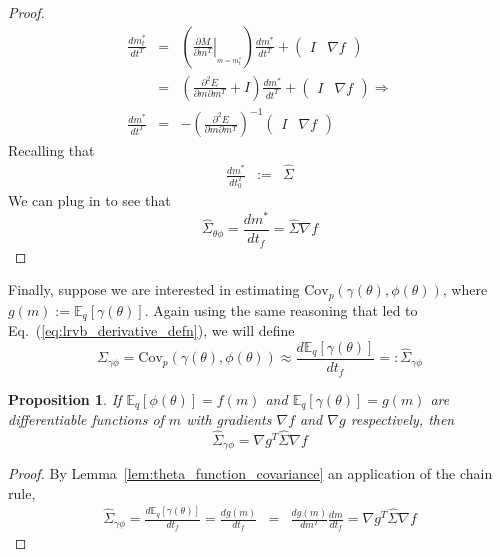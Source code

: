 \documentclass{article}\usepackage[]{graphicx}\usepackage[]{color}
\newcommand{\lem}[1]{Lemma~\ref{lem:#1}}
\newcommand{\eq}[1]{Eq.~(\ref{eq:#1})}
\newcommand{\truecov}{\Sigma} %
\newcommand{\lrcov}{\hat{\Sigma}} %
\newtheorem{proposition}[theorem]{Proposition}
\newcommand{\mbeq}{\mathbb{E}_{q}}
\newcommand{\cov}{\textrm{Cov}}
\begin{document}
\begin{proof}
\begin{eqnarray*}
  \frac{dm_{t}^{*}}{dt^{T}} & = &
    \left(\left.\frac{\partial M}{\partial m^{T}}\right|_{_{m=m_{t}^{*}}}\right)
    \frac{dm^{*}}{dt^{T}}+\left(\begin{array}{cc}
  I & \nabla f\end{array}\right)\\
   & = & \left(\frac{\partial^{2}E}{\partial m\partial m^{T}}+
    I\right)\frac{dm^{*}}{dt^{T}}+\left(\begin{array}{cc}
  I & \nabla f\end{array}\right) \Rightarrow \\
  \frac{dm^{*}}{dt^{T}} & = &
    -\left(\frac{\partial^{2}E}{\partial m\partial m^{T}}\right)^{-1}
    \left(\begin{array}{cc}I & \nabla f\end{array}\right)
  \end{eqnarray*}
  Recalling that
  \begin{eqnarray*}
  \frac{dm^{*}}{dt_{0}^{T}} & := & \lrcov
  \end{eqnarray*}
  We can plug in to see that
  \begin{equation}
  \lrcov_{\theta\phi} = \frac{dm^{*}}{dt_{f}} = \lrcov \nabla f
  \end{equation}
\end{proof}
%
Finally, suppose we are interested in estimating $\cov_p(\gamma(\theta),
\phi(\theta))$, where $g(m) := \mbeq\left[\gamma(\theta)\right]$.  Again using
the same reasoning that led to \eq{lrvb_derivative_defn}, we will define
%
\begin{equation*}
\truecov_{\gamma\phi} = \cov_p(\gamma(\theta), \phi(\theta))
\approx \frac{d \mbeq\left[\gamma(\theta)\right]}{dt_f} =: \lrcov_{\gamma\phi}
\end{equation*}
%
\begin{proposition} \label{prop:function_function_covariance}
  If $\mbeq\left[\phi(\theta)\right] = f(m)$ and
  $\mbeq\left[\gamma(\theta)\right] = g(m)$ are differentiable functions of $m$
  with gradients $\nabla f$ and $\nabla g$ respectively, then
  $$
    \lrcov_{\gamma\phi} = \nabla g^{T}\lrcov \nabla f
  $$
\end{proposition}
%
\begin{proof}
  By \lem{theta_function_covariance} an application of the chain rule,
  \begin{eqnarray*}
  \lrcov_{\gamma\phi} =
  \frac{d \mbeq\left[\gamma(\theta)\right]}{dt_f} =
  \frac{d g\left(m\right)}{dt_f} & = & \frac{dg(m)}{dm^{T}}\frac{dm}{dt_{f}}
    =  \nabla g^{T}\lrcov \nabla f
  \end{eqnarray*}
\end{proof}
\end{document}
